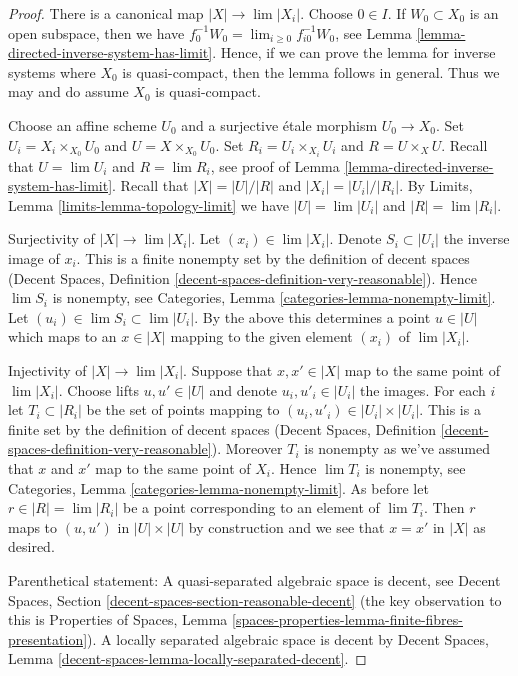 \documentclass{stacks-project}
\theoremstyle{plain}
\theoremstyle{definition}
\theoremstyle{remark}
\numberwithin{equation}{subsection}
\def\lim{\mathop{\mathrm{lim}}\nolimits}
\begin{document}
\begin{proof}
There is a canonical map $|X| \to \lim |X_i|$. Choose $0 \in I$.
If $W_0 \subset X_0$ is an open subspace, then we have
$f_0^{-1}W_0 = \lim_{i \geq 0} f_{i0}^{-1}W_0$, see
Lemma \ref{lemma-directed-inverse-system-has-limit}.
Hence, if we can prove the lemma for inverse systems where $X_0$
is quasi-compact, then the lemma follows in general. Thus we may and do
assume $X_0$ is quasi-compact.

\medskip\noindent
Choose an affine scheme $U_0$ and a surjective \'etale morphism $U_0 \to X_0$.
Set $U_i = X_i \times_{X_0} U_0$ and $U = X \times_{X_0} U_0$.
Set $R_i = U_i \times_{X_i} U_i$ and $R = U \times_X U$.
Recall that $U = \lim U_i$ and $R = \lim R_i$, see proof of
Lemma \ref{lemma-directed-inverse-system-has-limit}.
Recall that $|X| = |U|/|R|$ and $|X_i| = |U_i|/|R_i|$. By
Limits, Lemma \ref{limits-lemma-topology-limit} we have
$|U| = \lim |U_i|$ and $|R| = \lim |R_i|$.

\medskip\noindent
Surjectivity of $|X| \to \lim |X_i|$. Let $(x_i) \in \lim |X_i|$. Denote
$S_i \subset |U_i|$ the inverse image of $x_i$. This is a finite nonempty
set by the definition of decent spaces
(Decent Spaces, Definition \ref{decent-spaces-definition-very-reasonable}).
Hence $\lim S_i$ is nonempty, see
Categories, Lemma \ref{categories-lemma-nonempty-limit}.
Let $(u_i) \in \lim S_i \subset \lim |U_i|$. By the above this determines
a point $u \in |U|$ which maps to an $x \in |X|$ mapping to the given
element $(x_i)$ of $\lim |X_i|$.

\medskip\noindent
Injectivity of $|X| \to \lim |X_i|$. Suppose that $x, x' \in |X|$
map to the same point of $\lim |X_i|$. Choose lifts $u, u' \in |U|$
and denote $u_i, u'_i \in |U_i|$ the images.
For each $i$ let $T_i \subset |R_i|$ be the set of points mapping
to $(u_i, u'_i) \in |U_i| \times |U_i|$. This is a finite
set by the definition of decent spaces
(Decent Spaces, Definition \ref{decent-spaces-definition-very-reasonable}).
Moreover $T_i$ is nonempty as we've assumed that $x$ and $x'$ map to the
same point of $X_i$. Hence $\lim T_i$ is nonempty, see
Categories, Lemma \ref{categories-lemma-nonempty-limit}.
As before let $r \in |R| = \lim |R_i|$ be a point corresponding to an
element of $\lim T_i$. Then $r$ maps to $(u, u')$ in $|U| \times |U|$
by construction and we see that $x = x'$ in $|X|$ as desired.

\medskip\noindent
Parenthetical statement: A quasi-separated algebraic space is decent, see
Decent Spaces, Section \ref{decent-spaces-section-reasonable-decent}
(the key observation to this is Properties of Spaces, Lemma
\ref{spaces-properties-lemma-finite-fibres-presentation}).
A locally separated algebraic space is decent by
Decent Spaces, Lemma \ref{decent-spaces-lemma-locally-separated-decent}.
\end{proof}
\end{document}
